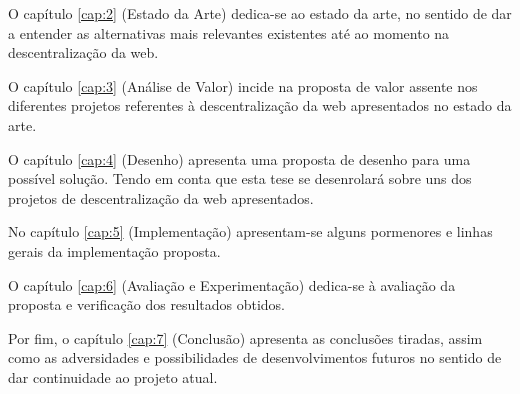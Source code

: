 O capítulo \ref{cap:2} (Estado da Arte) dedica-se ao estado da arte, no sentido de dar a entender as alternativas mais relevantes existentes até ao momento na descentralização da web.

O capítulo \ref{cap:3} (Análise de Valor) incide na proposta de valor assente nos diferentes projetos referentes à descentralização da web apresentados no estado da arte.

O capítulo \ref{cap:4} (Desenho) apresenta uma proposta de desenho para uma possível solução. Tendo em conta que esta tese se desenrolará sobre uns dos projetos de descentralização da web apresentados.

No capítulo \ref{cap:5} (Implementação) apresentam-se alguns pormenores e linhas gerais da implementação proposta.

O capítulo \ref{cap:6} (Avaliação e Experimentação) dedica-se à avaliação da proposta e verificação dos resultados obtidos.

Por fim, o capítulo \ref{cap:7} (Conclusão) apresenta as conclusões tiradas, assim como as adversidades e possibilidades de desenvolvimentos futuros no sentido de dar continuidade ao projeto atual.
